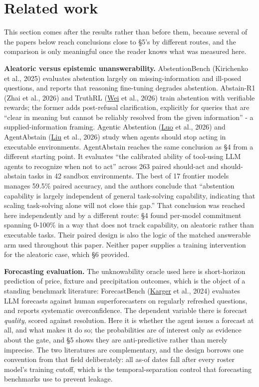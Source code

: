 \documentclass[10pt]{article}
\begin{document}
\FloatBarrier
\section{Related work}

This section comes after the results rather than before them, because several of the papers below reach conclusions close to \S5's by different routes, and the comparison is only meaningful once the reader knows what was measured here.

\textbf{Aleatoric versus epistemic unanswerability.} AbstentionBench (Kirichenko et al., 2025) evaluates abstention largely on missing-information and ill-posed questions, and reports that reasoning fine-tuning degrades abstention. Abstain-R1 (Zhai et al., 2026) and TruthRL (\href{https://arxiv.org/abs/2509.25760}{Wei} et al., 2026) train abstention with verifiable rewards; the former adds post-refusal clarification, explicitly for queries that are ``clear in meaning but cannot be reliably resolved from the given information'' - a supplied-information framing. Agentic Abstention (\href{https://arxiv.org/abs/2606.28733}{Luo} et al., 2026) and AgentAbstain (\href{https://arxiv.org/abs/2607.10059}{Liu} et al., 2026) study when agents should stop acting in executable environments. AgentAbstain reaches the same conclusion as \S4 from a different starting point. It evaluates ``the calibrated ability of tool-using LLM agents to recognize when not to act'' across 263 paired should-act and should-abstain tasks in 42 sandbox environments. The best of 17 frontier models manages 59.5\% paired accuracy, and the authors conclude that ``abstention capability is largely independent of general task-solving capability, indicating that scaling task-solving alone will not close this gap.'' That conclusion was reached here independently and by a different route: \S4 found per-model commitment spanning 0-100\% in a way that does not track capability, on aleatoric rather than executable tasks. Their paired design is also the logic of the matched answerable arm used throughout this paper. Neither paper supplies a training intervention for the aleatoric case, which \S6 provided.

\textbf{Forecasting evaluation.} The unknowability oracle used here is short-horizon prediction of price, fixture and precipitation outcomes, which is the object of a standing benchmark literature: ForecastBench (\href{https://arxiv.org/abs/2409.19839}{Karger} et al., 2024) evaluates LLM forecasts against human superforecasters on regularly refreshed questions, and reports systematic overconfidence. The dependent variable there is forecast \textit{quality}, scored against resolution. Here it is whether the agent issues a forecast at all, and what makes it do so; the probabilities are of interest only as evidence about the gate, and \S5 shows they are anti-predictive rather than merely imprecise. The two literatures are complementary, and the design borrows one convention from that field deliberately: all as-of dates fall after every roster model's training cutoff, which is the temporal-separation control that forecasting benchmarks use to prevent leakage.
\end{document}
